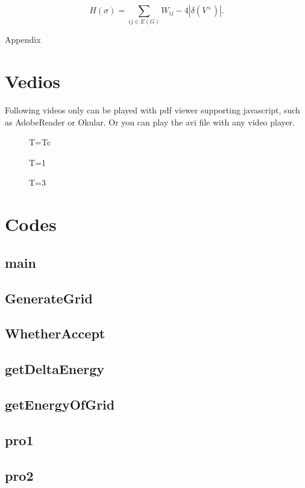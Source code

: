 \documentclass[11pt,openany]{book}              %
\begin{document}
\begin{equation}
  H(\sigma )=\sum _{ij\in E(G)}W_{ij}-4\left|\delta (V^{+})\right|.
\end{equation}
%
%
\appendix
\begin{center}
  \large Appendix
\end{center}
\section{Vedios}
Following videos only can be played with pdf viewer supporting javascript, such as AdobeReader or Okular. Or you can play the avi file with any video player.
\begin{figure}[H]
  \centering
  \caption{T=Tc}
  \label{vid:Tc}
\end{figure}
\begin{figure}[H]
  \centering
  \caption{T=1}
  \label{vid:1}
\end{figure}
\begin{figure}[H]
  \centering
  \caption{T=3}
  \label{vid:3}
\end{figure}
\section{Codes}
\newcommand{\code}[1]{\subsection{#1}}
\code{main}
\code{GenerateGrid}
\code{WhetherAccept}
\code{getDeltaEnergy}
\code{getEnergyOfGrid}
\code{pro1}
\code{pro2}
\end{document}

